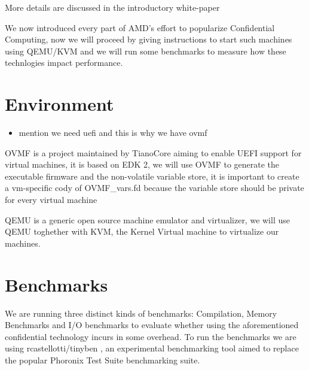 \documentclass[twocolumn]{article}
\begin{document}
More details are discussed in the introductory white-paper \cite{sev-snp}

We now introduced every part of AMD's effort to popularize Confidential Computing, now we will proceed by giving instructions to start such machines using QEMU/KVM and we will run some benchmarks to measure how these technlogies impact performance.


\section{Environment}
\label{sec:environment}

\begin{itemize}
    \item mention we need uefi and this is why we have ovmf
\end{itemize}
OVMF is a project maintained by TianoCore aiming to enable UEFI support for virtual machines, it is based on EDK 2, we will use OVMF to generate the executable firmware and the non-volatile variable store, it is important to create a vm-specific cody of OVMF\_vars.fd because the variable store should be private for every virtual machine

QEMU is a generic open source machine emulator and virtualizer, we will use QEMU toghether with KVM, the Kernel Virtual machine to virtualize our machines.

\section{Benchmarks}

We are running three distinct kinds of benchmarks: Compilation, Memory Benchmarks and I/O benchmarks to evaluate whether using the aforementioned confidential technology incurs in some overhead. To run the benchmarks we are using rcastellotti/tinyben \cite{tinyben}, an experimental benchmarking tool aimed to replace the popular Phoronix Test Suite \cite{pts} benchmarking suite.
\end{document}
